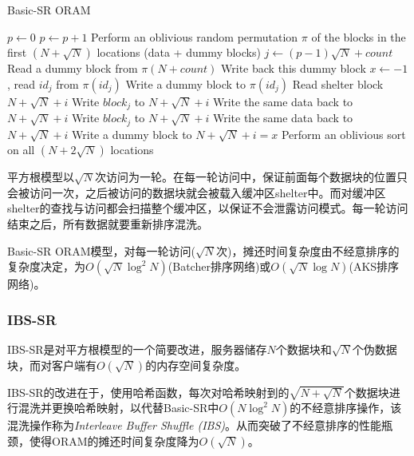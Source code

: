 \begin{algorithm}[H]
    \label{alg:BSR}
    \caption{Basic-SR ORAM}
    \begin{algorithmic}[1]
        \State $p \gets 0$
            \State $p \gets p+1$
            \State Perform an oblivious random permutation $\pi$ of the blocks in the first $(N + \sqrt N)$ locations (data + dummy blocks)
                \State $j\gets (p-1)\sqrt N+count$
                    \State Read a dummy block from $\pi(N+count)$
                    \State Write back this dummy block
                \Else{}
                    \State $x\gets -1$, read $id_j$ from $\pi(id_j)$
                    \State Write a dummy block to $\pi(id_j)$
                \EndIf
                    \State Read shelter block $N+\sqrt N+i$
                            \State Write $block_j$ to $N+\sqrt N+i$
                        \Else{}
                            \State Write the same data back to $N+\sqrt N+i$
                        \EndIf
                            \State Write $block_j$ to $N+\sqrt N+i$
                        \Else{}
                            \State Write the same data back to $N+\sqrt N+i$
                        \EndIf
                    \Else
                        \State Write a dummy block to $N+\sqrt N+i=x$
                    \EndIf
                \EndFor
            \EndFor
            \State Perform an oblivious sort on all $(N + 2\sqrt N)$ locations
        \EndWhile
    \end{algorithmic}
\end{algorithm}
平方根模型以$\sqrt N$次访问为一轮。在每一轮访问中，保证前面每个数据块的位置只会被访问一次，之后被访问的数据块就会被载入缓冲区shelter中。而对缓冲区shelter的查找与访问都会扫描整个缓冲区，以保证不会泄露访问模式。每一轮访问结束之后，所有数据就要重新排序混洗。\par
Basic-SR ORAM模型，对每一轮访问($\sqrt N$次)，摊还时间复杂度由不经意排序的复杂度决定，为$O(\sqrt N\log^2 N)$(Batcher排序网络)或$O(\sqrt N\log N)$(AKS排序网络)。
\subsubsection{IBS-SR}
IBS-SR是对平方根模型的一个简要改进\cite{ref6}，服务器储存$N$个数据块和$\sqrt N$个伪数据块，而对客户端有$O(\sqrt N)$的内存空间复杂度。\par
IBS-SR的改进在于，使用哈希函数，每次对哈希映射到的$\sqrt{N+\sqrt{N}}$个数据块进行混洗并更换哈希映射，以代替Basic-SR中$O(N\log^2 N)$的不经意排序操作，该混洗操作称为\textit{Interleave Buffer Shuffle (IBS)}。从而突破了不经意排序的性能瓶颈，使得ORAM的摊还时间复杂度降为$O(\sqrt{N})$。

